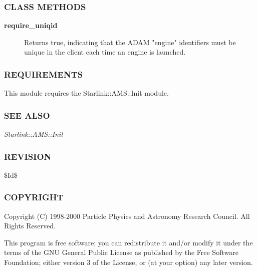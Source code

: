 \subsubsection*{CLASS METHODS\label{ORAC::Msg::Control::AMS_CLASS_METHODS}}
\begin{description}

\item[{\textbf{require\_uniqid}}] \mbox{}

Returns true, indicating that the ADAM "engine" identifiers must
be unique in the client each time an engine is launched.

\end{description}
\subsubsection*{REQUIREMENTS\label{ORAC::Msg::Control::AMS_REQUIREMENTS}}


This module requires the Starlink::AMS::Init module.

\subsubsection*{SEE ALSO\label{ORAC::Msg::Control::AMS_SEE_ALSO}}


\emph{Starlink::AMS::Init}

\subsubsection*{REVISION\label{ORAC::Msg::Control::AMS_REVISION}}


\$Id\$

\subsubsection*{COPYRIGHT\label{ORAC::Msg::Control::AMS_COPYRIGHT}}


Copyright (C) 1998-2000 Particle Physics and Astronomy Research
Council. All Rights Reserved.



This program is free software; you can redistribute it and/or modify it under
the terms of the GNU General Public License as published by the Free Software
Foundation; either version 3 of the License, or (at your option) any later
version.



